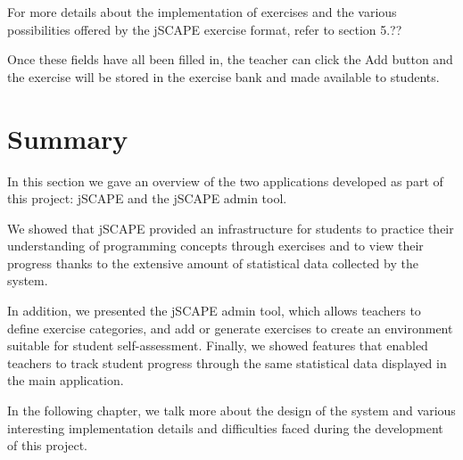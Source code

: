 For more details about the implementation of exercises and the various possibilities offered by the jSCAPE exercise format, refer to section 5.??\newline

Once these fields have all been filled in, the teacher can click the Add button and the exercise will be stored in the exercise bank and made available to students.

\section{Summary}
In this section we gave an overview of the two applications developed as part of this project: jSCAPE and the jSCAPE admin tool.\newline

We showed that jSCAPE provided an infrastructure for students to practice their understanding of programming concepts through exercises and to view their progress thanks to the extensive amount of statistical data collected by the system.\newline

In addition, we presented the jSCAPE admin tool, which allows teachers to define exercise categories, and add or generate exercises to create an environment suitable for student self-assessment. Finally, we showed features that enabled teachers to track student progress through the same statistical data displayed in the main application. \newline

In the following chapter, we talk more about the design of the system and various interesting implementation details and difficulties faced during the development of this project.

